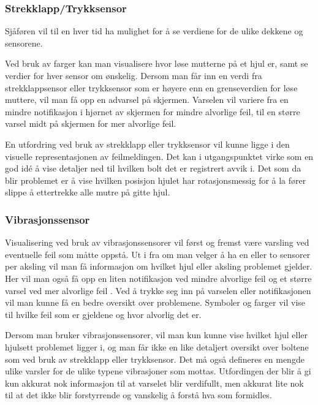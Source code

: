 \subsubsection{Strekklapp/Trykksensor}
Sjåføren vil til en hver tid ha mulighet for å se verdiene for de ulike dekkene 
og sensorene. 

Ved bruk av farger kan man visualisere hvor løse mutterne på et hjul er, samt se 
verdier for hver sensor om ønskelig. Dersom man får inn en verdi fra 
strekklappsensor eller trykksensor som er høyere enn en grenseverdien for løse 
muttere, vil man få opp en advarsel på skjermen. Varselen vil variere fra en 
mindre notifikasjon i hjørnet av skjermen for mindre alvorlige feil, til en 
større varsel midt på skjermen for mer alvorlige feil.

En utfordring ved bruk av strekklapp eller trykksensor vil kunne ligge i den 
visuelle representasjonen av feilmeldingen. Det kan i utgangspunktet virke som 
en god idé å vise detaljer ned til hvilken bolt det er registrert avvik i. Det 
som da blir problemet er å vise hvilken posisjon hjulet har rotasjonsmessig for 
å la fører slippe å ettertrekke alle mutre på gitte hjul.

\subsubsection{Vibrasjonssensor}
Visualisering ved bruk av vibrasjonssensorer vil først og fremst være varsling 
ved eventuelle feil som måtte oppstå. Ut i fra om man velger å ha en eller to 
sensorer per aksling vil man få informasjon om hvilket hjul eller aksling 
problemet gjelder. Her vil man også få opp en liten notifikasjon ved mindre 
alvorlige feil og et større varsel ved mer alvorlige feil . Ved å trykke seg 
inn på varselen eller notifikasjonen vil man kunne få en bedre oversikt over 
problemene. Symboler og farger vil vise til hvilke feil som er gjeldene og hvor 
alvorlig det er.

Dersom man bruker vibrasjonssensorer, vil man kun kunne vise hvilket hjul eller 
hjulsett problemet ligger i, og man får ikke en like detaljert oversikt over 
boltene som ved bruk av strekklapp eller trykksensor. Det må også defineres 
en mengde ulike varsler for de ulike typene vibrasjoner som mottas. 
Utfordingen der blir å gi kun akkurat nok informasjon til at varselet blir 
verdifullt, men akkurat lite nok til at det ikke blir forstyrrende og vanskelig 
å forstå hva som formidles.